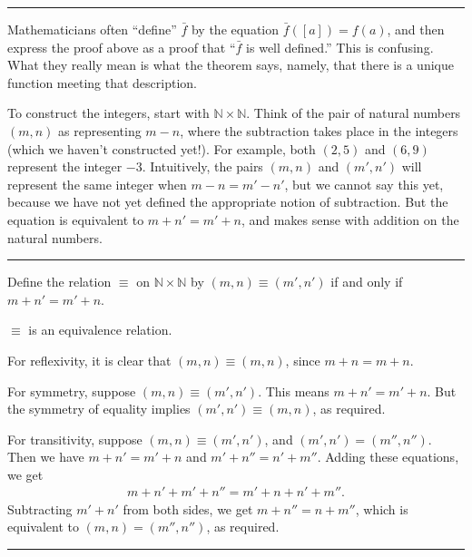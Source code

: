 \documentclass[letterpaper,10pt,english]{sphinxmanual}
\begin{document}
\bigskip\hrule\bigskip


\sphinxAtStartPar
Mathematicians often “define” \(\bar f\) by the equation \(\bar f ([a])= f(a)\), and then express the proof above as a proof that “\(\bar f\) is well defined.” This is confusing. What they really mean is what the theorem says, namely, that there is a unique function meeting that description.

\sphinxAtStartPar
To construct the integers, start with \(\mathbb{N} \times \mathbb{N}\). Think of the pair of natural numbers \((m, n)\) as representing \(m - n\), where the subtraction takes place in the integers (which we haven’t constructed yet!). For example, both \((2, 5)\) and \((6, 9)\) represent the integer \(-3\). Intuitively, the pairs \((m, n)\) and \((m', n')\) will represent the same integer when \(m - n = m' - n'\), but we cannot say this yet, because we have not yet defined the appropriate notion of subtraction. But the equation is equivalent to \(m + n' = m' + n\), and  makes sense with addition on the natural numbers.


\bigskip\hrule\bigskip


\sphinxAtStartPar
{} Define the relation \(\equiv\) on \(\mathbb{N} \times \mathbb{N}\) by \((m, n) \equiv (m', n')\) if and only if \(m + n' = m' + n\).

\sphinxAtStartPar
{} \(\equiv\) is an equivalence relation.

\sphinxAtStartPar
{} For reflexivity, it is clear that \((m, n) \equiv (m, n)\), since \(m + n = m + n\).

\sphinxAtStartPar
For symmetry, suppose \((m, n) \equiv (m', n')\). This means \(m + n' = m' + n\). But the symmetry of equality implies \((m', n') \equiv (m, n)\), as required.

\sphinxAtStartPar
For transitivity, suppose \((m, n) \equiv (m', n')\), and \((m', n') = (m'', n'')\). Then we have \(m + n' = m' + n\) and \(m' + n'' = n' + m''\). Adding these equations, we get
\begin{equation*}
\begin{split}m + n' + m' + n'' = m' + n + n' + m''.\end{split}
\end{equation*}
\sphinxAtStartPar
Subtracting \(m' + n'\) from both sides, we get \(m + n'' = n + m''\), which is equivalent to \((m, n) = (m'', n'')\), as required.


\bigskip\hrule\bigskip
\end{document}
